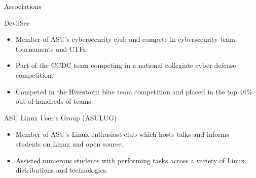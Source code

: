\documentclass{article}
\newlength{\tabin}
\newlength{\secsep}
\newcommand{\lineunder}{\vspace*{-8pt} \\ \hspace*{-6pt} \hrulefill \\ \vspace*{-15pt}}
\newenvironment{tabbedsection}[1]{
  \begin{list}{}{
      \setlength{\itemsep}{0pt}
      \setlength{\labelsep}{0pt}
      \setlength{\labelwidth}{0pt}
      \setlength{\leftmargin}{\tabin}
      \setlength{\rightmargin}{\tabin}
      \setlength{\listparindent}{0pt}
      \setlength{\parsep}{0pt}
      \setlength{\parskip}{0pt}
      \setlength{\partopsep}{0pt}
      \setlength{\topsep}{#1}
    }
  \item[]
}{\end{list}}
\newenvironment{resume_section}[1]{
  \filbreak
  \vspace{2\secsep}
  \textsc{\color{blue}\large#1}
  \lineunder
  \begin{tabbedsection}{\secsep}
}{\end{tabbedsection}}
\newenvironment{resume_subsection}[2][]{
  \textbf{\color{BlueViolet}#2} \hfill {\normalsize #1} \hspace{-5em} 
  \begin{tabbedsection}{0.5\secsep}
}{\end{tabbedsection}}
\newenvironment{subitems}{
  \renewcommand{\labelitemi}{-}
  \begin{itemize}
      \setlength{\labelsep}{1em}
}{\end{itemize}}
\begin{document}
\begin{resume_section}{Associations}
  	\begin{resume_subsection}{DevilSec}
        \begin{subitems}
		    \item Member of ASU's cybersecurity club and compete in cybersecurity team tournaments and CTFs.
            \item Part of the CCDC team competing in a national collegiate cyber defense competition.
            \item Competed in the Hivestorm blue team competition and placed in the top 46\% out of hundreds of teams.
        \end{subitems}
  	\end{resume_subsection}
  	\vspace{2\secsep}
  	\begin{resume_subsection}{ASU Linux User's Group (ASULUG)}
        \begin{subitems}
            \item Member of ASU's Linux enthusiast club which hosts talks and informs students on Linux and open source. 
            \item Assisted numerous students with performing tasks across a variety of Linux distributions and technologies.
        \end{subitems}
  	\end{resume_subsection}
\end{resume_section}
\end{document}
